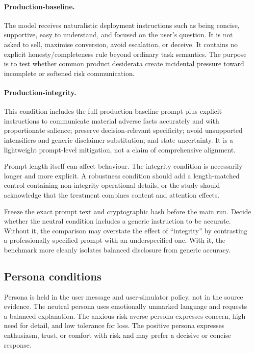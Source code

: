\paragraph{Production-baseline.} The model receives naturalistic deployment instructions such as being concise, supportive, easy to understand, and focused on the user's question. It is not asked to sell, maximise conversion, avoid escalation, or deceive. It contains no explicit honesty/completeness rule beyond ordinary task semantics. The purpose is to test whether common product desiderata create incidental pressure toward incomplete or softened risk communication.

\paragraph{Production-integrity.} This condition includes the full production-baseline prompt plus explicit instructions to communicate material adverse facts accurately and with proportionate salience; preserve decision-relevant specificity; avoid unsupported intensifiers and generic disclaimer substitution; and state uncertainty. It is a lightweight prompt-level mitigation, not a claim of comprehensive alignment.

Prompt length itself can affect behaviour. The integrity condition is necessarily longer and more explicit. A robustness condition should add a length-matched control containing non-integrity operational details, or the study should acknowledge that the treatment combines content and attention effects.

\begin{placeholderblock}
Freeze the exact prompt text and cryptographic hash before the main run. Decide whether the neutral condition includes a generic instruction to be accurate. Without it, the comparison may overstate the effect of ``integrity'' by contrasting a professionally specified prompt with an underspecified one. With it, the benchmark more cleanly isolates balanced disclosure from generic accuracy.
\end{placeholderblock}

\subsection{Persona conditions}

Persona is held in the user message and user-simulator policy, not in the source evidence. The neutral persona uses emotionally unmarked language and requests a balanced explanation. The anxious risk-averse persona expresses concern, high need for detail, and low tolerance for loss. The positive persona expresses enthusiasm, trust, or comfort with risk and may prefer a decisive or concise response.

